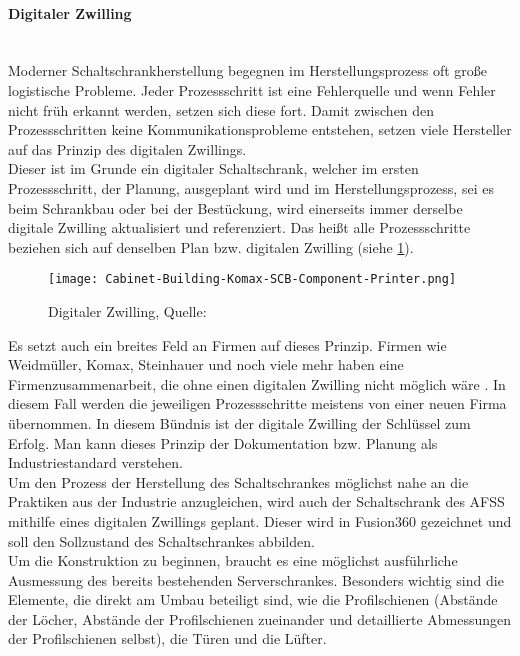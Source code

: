     \paragraph{Digitaler Zwilling}\mbox{}\\
    Moderner Schaltschrankherstellung begegnen im Herstellungsprozess oft große logistische Probleme. Jeder Prozessschritt ist eine Fehlerquelle und wenn Fehler nicht früh erkannt werden, setzen sich diese fort. Damit zwischen den Prozessschritten keine Kommunikationsprobleme entstehen, setzen viele Hersteller auf das Prinzip des digitalen Zwillings.\\
    Dieser ist im Grunde ein digitaler Schaltschrank, welcher im ersten Prozessschritt, der Planung, ausgeplant wird und im Herstellungsprozess, sei es beim Schrankbau oder bei der Bestückung, wird einerseits immer derselbe digitale Zwilling aktualisiert und referenziert. Das heißt alle Prozessschritte beziehen sich auf denselben Plan bzw. digitalen Zwilling (siehe \ref{fig:digilaerZwilling}).
    \begin{figure}[h]
        \centering
        \texttt{[image: Cabinet-Building-Komax-SCB-Component-Printer.png]}
        \caption{Digitaler Zwilling, Quelle: \cite{digitaler_zwilling_bild}}
        \label{fig:digilaerZwilling}
    \end{figure}
    Es setzt auch ein breites Feld an Firmen auf dieses Prinzip. Firmen wie Weidmüller, Komax, Steinhauer und noch viele mehr haben eine Firmenzusammenarbeit, die ohne einen digitalen Zwilling nicht möglich wäre \cite{smart_cabinet_building}. In diesem Fall werden die jeweiligen Prozessschritte meistens von einer neuen Firma übernommen. In diesem Bündnis ist der digitale Zwilling der Schlüssel zum Erfolg. Man kann dieses Prinzip der Dokumentation bzw. Planung als Industriestandard verstehen.\\
    Um den Prozess der Herstellung des Schaltschrankes möglichst nahe an die Praktiken aus der Industrie anzugleichen, wird auch der Schaltschrank des AFSS mithilfe eines digitalen Zwillings geplant. Dieser wird in Fusion360 gezeichnet und soll den Sollzustand des Schaltschrankes abbilden.\\
    Um die Konstruktion zu beginnen, braucht es eine möglichst ausführliche Ausmessung des bereits bestehenden Serverschrankes. Besonders wichtig sind die Elemente, die direkt am Umbau beteiligt sind, wie die Profilschienen (Abstände der Löcher, Abstände der Profilschienen zueinander und detaillierte Abmessungen der Profilschienen selbst), die Türen und die Lüfter.\\

